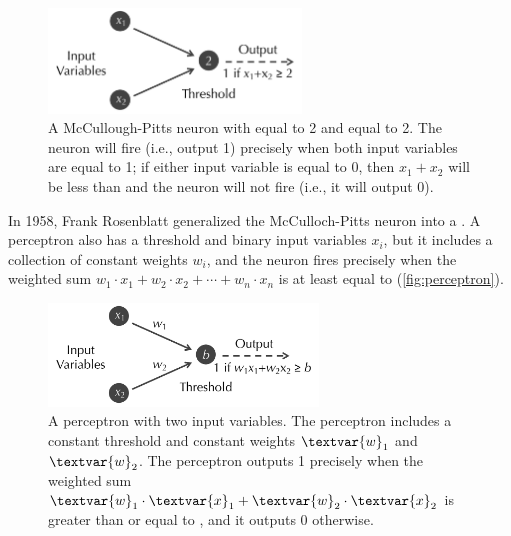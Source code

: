 \begin{figure}[h]
\centering
\mySfFamily
\includegraphics[width = 0.6\textwidth]{../images/MP_neuron.png}
\caption{A McCullough-Pitts neuron with  equal to 2 and  equal to 2. The neuron will fire (i.e., output 1) precisely when both input variables are equal to 1; if either input variable is equal to 0, then $x_1 + x_2$ will be less than  and the neuron will not fire (i.e., it will output 0).}
\label{fig:MP_neuron}
\end{figure}

In 1958, Frank Rosenblatt generalized the McCulloch-Pitts neuron into a . A perceptron also has a threshold  and  binary input variables $x_i$, but it includes a collection of constant weights $w_i$, and the neuron fires precisely when the weighted sum $w_1 \cdot x_1 + w_2 \cdot x_2 + \cdots + w_n \cdot x_n$ is at least equal to  (\autoref{fig:perceptron}).\\

\begin{note}\end{note}

\begin{figure}[h]
\centering
\mySfFamily
\includegraphics[width = 0.64\textwidth]{../images/perceptron.png}
\caption{A perceptron with two input variables. The perceptron includes a constant threshold and constant weights $\textvar{w}_\text{1}$ and $\textvar{w}_\text{2}$. The perceptron outputs 1 precisely when the weighted sum $\textvar{w}_\text{1} \cdot \textvar{x}_\text{1} + \textvar{w}_\text{2} \cdot \textvar{x}_\text{2}$ is greater than or equal to , and it outputs 0 otherwise.}
\label{fig:perceptron}
\end{figure}

